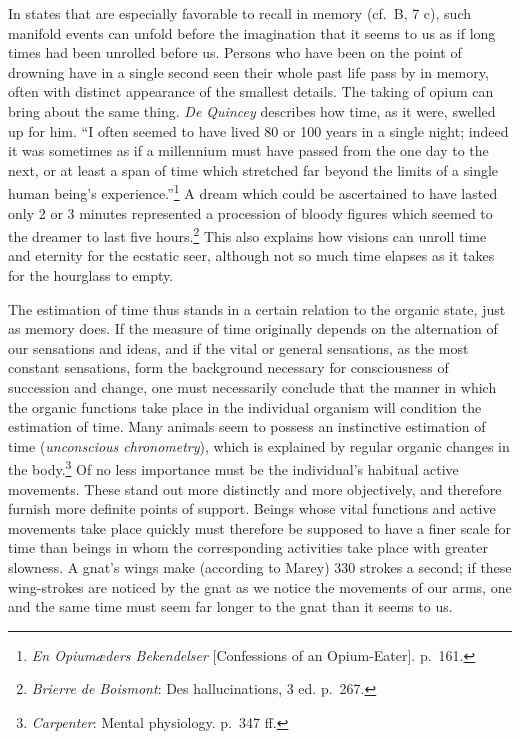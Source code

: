 \documentclass[12pt,a4paper]{book}
\newcommand{\opage}[1]{\marginnote{\footnotesize\textit{[#1]}}}
\begin{document}
In states that are especially favorable to recall in memory (cf.\ B, 7
c), such manifold events can unfold before the imagination that it seems
to us as if long times had been unrolled before us. Persons who have been
on the point of drowning have in a single second seen their whole past
life pass by in memory, often with distinct appearance of the smallest
details. The taking of opium can bring about the same thing. \emph{De
Quincey} describes how time, as it were, swelled up for him. ``I often
seemed to have lived 80 or 100 years in a single night; indeed it was
sometimes as if a millennium must have passed from the one day to the
next, or at least a span of time which stretched far beyond the limits
of a single human being's
experience.''\footnote{\textit{En Opiumæders Bekendelser}
[Confessions of an Opium-Eater]. p.~161.} A dream which could be
ascertained to have lasted only 2 or 3 minutes represented a procession
of bloody figures which seemed to the dreamer to last five
hours.\footnote{\emph{Brierre de Boismont}: Des hallucinations, 3 ed.
p.~267.} This also explains
\opage{233}how visions can unroll time and eternity for the ecstatic
seer, although not so much time elapses as it takes for the hourglass to
empty.

The estimation of time thus stands in a certain relation to the organic
state, just as memory does. If the measure of time originally depends on
the alternation of our sensations and ideas, and if the vital or general
sensations, as the most constant sensations, form the background
necessary for consciousness of succession and change, one must
necessarily conclude that the manner in which the organic functions take
place in the individual organism will condition the estimation of time.
Many animals seem to possess an instinctive estimation of time
(\textit{unconscious chronometry}), which is explained by regular organic
changes
in the body.\footnote{\emph{Carpenter}: Mental physiology. p.~347 ff.} Of
no less importance must be the individual's habitual active movements.
These stand out more distinctly and more objectively, and therefore
furnish more definite points of support. Beings whose vital functions and
active movements take place quickly must therefore be supposed to have a
finer scale for time than beings in whom the corresponding activities
take place with greater slowness. A gnat's wings make (according to
Marey) 330 strokes a second; if these wing-strokes are noticed by the
gnat as we notice the movements of our arms, one and the same time must
seem far longer to the gnat than it seems to us.
\end{document}
